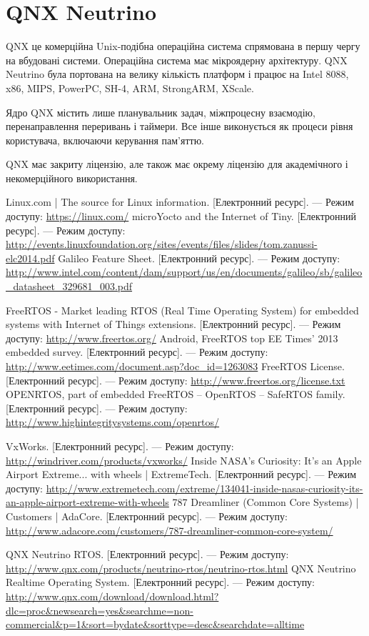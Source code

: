 \documentclass[oneside,14pt,a4paper,final]{extreport}
\newcommand{\eresource}[2]{#1. [Електронний ресурс]. --- Режим доступу: \url{#2}}
\begin{document}
\section{QNX Neutrino}

QNX\cite{qnx} це комерційна Unix-подібна операційна система спрямована в першу чергу на вбудовані системи. Операційна система має мікроядерну архітектуру. QNX Neutrino була портована на велику кількість платформ і працює на Intel 8088, x86, MIPS, PowerPC, SH-4, ARM, StrongARM, XScale.

Ядро QNX містить лише планувальник задач, міжпроцесну взаємодію, перенаправлення переривань і таймери. Все інше виконується як процеси рівня користувача, включаючи керування пам'яттю.

QNX має закриту ліцензію, але також має окрему ліцензію для академічного і некомерційного використання\cite{qnx:noncommercial}.


\begin{thebibliography}{00}
    \eresource{Linux.com | The source for Linux information}{https://linux.com/}
    \eresource{microYocto and the Internet of Tiny}{http://events.linuxfoundation.org/sites/events/files/slides/tom.zanussi-elc2014.pdf}
    \eresource{Galileo Feature Sheet}{http://www.intel.com/content/dam/support/us/en/documents/galileo/sb/galileo\_datasheet\_329681\_003.pdf}

    \eresource{FreeRTOS - Market leading RTOS (Real Time Operating System) for embedded systems with Internet of Things extensions}{http://www.freertos.org/}
    \eresource{Android, FreeRTOS top EE Times' 2013 embedded survey}{http://www.eetimes.com/document.asp?doc\_id=1263083}
    \eresource{FreeRTOS License}{http://www.freertos.org/license.txt}
    \eresource{OPENRTOS, part of embedded FreeRTOS -- OpenRTOS -- SafeRTOS family}{http://www.highintegritysystems.com/openrtos/}

    \eresource{VxWorks}{http://windriver.com/products/vxworks/}
    \eresource{Inside NASA's Curiosity: It's an Apple Airport Extreme... with wheels | ExtremeTech}{http://www.extremetech.com/extreme/134041-inside-nasas-curiosity-its-an-apple-airport-extreme-with-wheels}
    \eresource{787 Dreamliner (Common Core Systems) | Customers | AdaCore}{http://www.adacore.com/customers/787-dreamliner-common-core-system/}

    \eresource{QNX Neutrino RTOS}{http://www.qnx.com/products/neutrino-rtos/neutrino-rtos.html}
    \eresource{QNX Neutrino Realtime Operating System}{http://www.qnx.com/download/download.html?dlc=proc&newsearch=yes&searchme=non-commercial&p=1&sort=bydate&sorttype=desc&searchdate=alltime}
\end{thebibliography}
\end{document}
